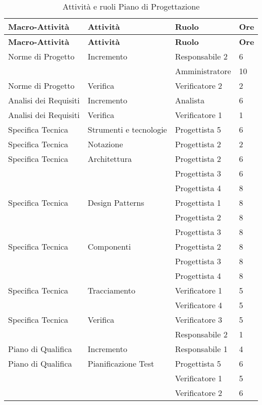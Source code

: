 {{	\renewcommand*{\arraystretch}{1.4}
	\begin{longtable} [c]{| l | l | l | l |}
		\caption{Attività e ruoli Piano di Progettazione \label{tab:pianoprogettazione}}\\
		 \hline
		 \textbf{Macro-Attività} & \textbf{Attività} & \textbf{Ruolo} & \textbf{Ore}\\
		 \hline
		 \endfirsthead
		 \hline
		 \textbf{Macro-Attività} & \textbf{Attività} & \textbf{Ruolo} & \textbf{Ore}\\
		 \hline
			\endhead
		 \hline
		 \endfoot
		 \hline
		 \endlastfoot
		 Norme di Progetto\ped{g} & Incremento & Responsabile 2 & 6\\
		 &	&	Amministratore & 10\\
		 Norme di Progetto\ped{g} & Verifica & Verificatore 2 & 2 \\
		 Analisi dei Requisiti\ped{g} & Incremento & Analista & 6 \\
		 Analisi dei Requisiti\ped{g} & Verifica & Verificatore 1 & 1 \\
		 Specifica Tecnica & Strumenti e tecnologie & Progettista 5 & 6 \\
		 Specifica Tecnica & Notazione & Progettista 2 & 2 \\
		 Specifica Tecnica & Architettura & Progettista 2 & 6\\
		 &	&	Progettista 3 & 6\\
		 &	&	Progettista 4 & 8\\
		 Specifica Tecnica & Design Patterns & Progettista 1 & 8\\
		 &	&	Progettista 2 & 8\\
		 &	&	Progettista 3 & 8\\
		 Specifica Tecnica & Componenti & Progettista 2 & 8\\
		 &	&	Progettista 3 & 8\\
		 &	&	Progettista 4 & 8\\
		 Specifica Tecnica & Tracciamento & Verificatore 1 & 5\\
		 &	&	Verificatore 4 & 5\\
		Specifica Tecnica & Verifica & Verificatore 3 & 5\\
		 &	&	Responsabile 2 & 1\\
		Piano di Qualifica & Incremento & Responsabile 1 & 4 \\
		Piano di Qualifica & Pianificazione Test & Progettista 5 & 6\\
		&	&	Verificatore 1 & 5\\
		&	&	Verificatore 2 & 6\\

\end{longtable}}}
